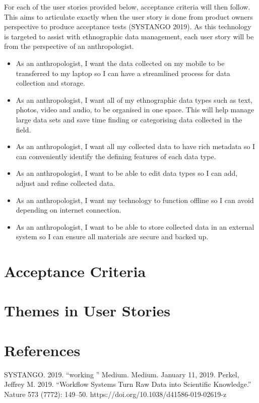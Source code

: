 \documentclass{article}
\begin{document}
For each of the user stories provided below, acceptance criteria will then follow. This aims to articulate exactly when the user story is done from product owners perspective to produce acceptance tests (SYSTANGO 2019). As this technology is targeted to assist with ethnographic data management, each user story will be from the perspective of an anthropologist.
\clearpage



    

\begin{itemize}
\item As an anthropologist, I want the data collected on my mobile to be transferred to my laptop so I can have a streamlined process for data collection and storage.
\item As an anthropologist, I want all of my ethnographic data types such as text, photos, video and audio, to be organised in one space. This will help manage large data sets and save time finding or categorising data collected in the field. 
\item As an anthropologist, I want all my collected data to have rich metadata so I can conveniently identify the defining features of each data type.
\item As an anthropologist, I want to be able to edit data types so I can add, adjust and refine collected data.
\item As an anthropologist, I want my technology to function offline so I can avoid depending on internet connection.
\item As an anthropologist, I want to be able to store collected data in an external system so I can ensure all materials are secure and backed up.  
\end{itemize}






\section{Acceptance Criteria}

\section{Themes in User Stories}

\section{References}
SYSTANGO. 2019. “working ” Medium. Medium. January 11, 2019. \.Perkel, Jeffrey M. 2019. “Workflow Systems Turn Raw Data into Scientific Knowledge.” Nature 573 (7772): 149–50. https://doi.org/10.1038/d41586-019-02619-z
\end{document}
